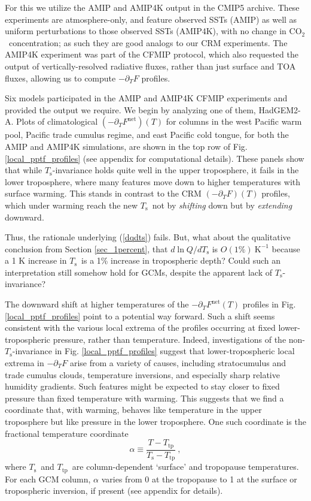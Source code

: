 \documentclass[10pt]{article}
\newcommand{\beqn}{\begin{equation}}
\newcommand{\eeqn}{\end{equation}}
\newcommand{\eqnref}[1]{(\ref{#1})}
\newcommand{\ppt}{\ensuremath{\partial_T}}
\newcommand{\cotwo}{\ensuremath{\mathrm{CO_2}}}
\newcommand{\FLW}{\ensuremath{F^\mathrm{LW}}}
\newcommand{\Fnet}{\ensuremath{F^\mathrm{net}}}
\newcommand{\Ts}{\ensuremath{T_\mathrm{s}}}
\newcommand{\Ttp}{\ensuremath{T_\mathrm{tp}}}
\newcommand{\Kinverse}{\ensuremath{\mathrm{K^{-1}}}}
\begin{document}
For this we utilize the AMIP and AMIP4K  output in the CMIP5 archive. These experiments are atmosphere-only, and feature observed SSTs (AMIP) as well as uniform perturbations to those observed SSTs (AMIP4K), with no change in \cotwo\ concentration; as such they are good analogs to our CRM experiments. The AMIP4K experiment was part of the CFMIP protocol, which also requested the output of vertically-resolved radiative fluxes, rather than just surface and TOA fluxes, allowing us to compute $-\ppt F$ profiles.

Six models participated in the AMIP and AMIP4K CFMIP experiments and provided the output we require. We begin by analyzing one of them, HadGEM2-A. Plots of climatological $(-\ppt \Fnet)(T)$ for columns in the west Pacific warm pool, Pacific trade cumulus regime, and east Pacific cold tongue,  for both the AMIP and AMIP4K simulations, are shown in the top row of Fig. \ref{local_pptf_profiles} (see appendix for computational details). These panels show that while \Ts-invariance holds quite well in the upper troposphere, it fails in the lower troposphere, where many features move down to higher temperatures with surface warming. This stands in contrast to the CRM $(-\ppt F)(T)$ profiles, which under warming reach the new \Ts\ not by \emph{shifting} down but by \emph{extending} downward.

Thus, the rationale underlying \eqnref{dqdts} fails. But, what about the qualitative conclusion from Section \ref{sec_1percent}, that $d\ln Q/d\Ts$ is $O(1\%)\ \Kinverse$ because a 1 K increase in \Ts\ is a 1\% increase in tropospheric depth? Could such an interpretation still somehow hold for GCMs, despite the apparent lack of \Ts-invariance?

The downward shift at higher temperatures of the $-\ppt \Fnet(T)$ profiles  in  Fig. \ref{local_pptf_profiles} point to a potential way forward. Such a shift seems consistent with the various local extrema of the profiles occurring at fixed lower-tropospheric pressure, rather than temperature. Indeed, investigations of the non-\Ts-invariance in Fig. \ref{local_pptf_profiles} suggest that lower-tropospheric local extrema in $-\ppt F$  arise from a variety of causes, including stratocumulus and trade cumulus clouds, temperature inversions, and especially sharp relative humidity gradients. Such features might be expected to stay closer to fixed pressure than fixed temperature with warming. This suggests that we find a coordinate that, with warming, behaves like temperature in the upper troposphere but like pressure in the lower troposphere. One such coordinate is the fractional temperature coordinate
\beqn
	\alpha \equiv \frac{T-\Ttp}{\Ts - \Ttp}\ ,
	\label{alpha_def}
\eeqn
where \Ts\ and \Ttp\ are column-dependent `surface' and tropopause temperatures. For each GCM column, $\alpha$ varies from 0 at the tropopause to 1 at the surface or tropospheric inversion, if present  (see appendix for details).
\end{document}
